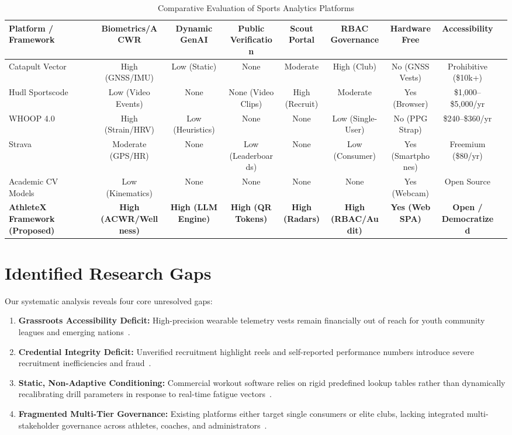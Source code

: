 \documentclass[conference]{IEEEtran}
\begin{document}
\begin{table}[htbp]
\caption{Comparative Evaluation of Sports Analytics Platforms}
\label{tab:comparison}
\centering
\begin{tabular}{@{}lcccccccc@{}}
\toprule
\textbf{Platform / Framework} & \textbf{Biometrics/ACWR} & \textbf{Dynamic GenAI} & \textbf{Public Verification} & \textbf{Scout Portal} & \textbf{RBAC Governance} & \textbf{Hardware Free} & \textbf{Accessibility} \\ \midrule
Catapult Vector~\cite{bourdon2017} & High (GNSS/IMU) & Low (Static) & None & Moderate & High (Club) & No (GNSS Vests) & Prohibitive (\$10k+) \\
Hudl Sportscode~\cite{paul2015} & Low (Video Events) & None & None (Video Clips) & High (Recruit) & Moderate & Yes (Browser) & \$1,000--\$5,000/yr \\
WHOOP 4.0~\cite{halson2014} & High (Strain/HRV) & Low (Heuristics) & None & None & Low (Single-User) & No (PPG Strap) & \$240--\$360/yr \\
Strava~\cite{buchheit2013} & Moderate (GPS/HR) & None & Low (Leaderboards) & None & Low (Consumer) & Yes (Smartphones) & Freemium (\$80/yr) \\
Academic CV Models~\cite{cao2021,lugaresi2019} & Low (Kinematics) & None & None & None & None & Yes (Webcam) & Open Source \\
\textbf{AthleteX Framework (Proposed)} & \textbf{High (ACWR/Wellness)} & \textbf{High (LLM Engine)} & \textbf{High (QR Tokens)} & \textbf{High (Radars)} & \textbf{High (RBAC/Audit)} & \textbf{Yes (Web SPA)} & \textbf{Open / Democratized} \\ \bottomrule
\end{tabular}
\end{table}

\section{Identified Research Gaps}
Our systematic analysis reveals four core unresolved gaps:
\begin{enumerate}
    \item \textbf{Grassroots Accessibility Deficit:} High-precision wearable telemetry vests remain financially out of reach for youth community leagues and emerging nations~\cite{baker2010,bourdon2017}.
    \item \textbf{Credential Integrity Deficit:} Unverified recruitment highlight reels and self-reported performance numbers introduce severe recruitment inefficiencies and fraud~\cite{phillips2021}.
    \item \textbf{Static, Non-Adaptive Conditioning:} Commercial workout software relies on rigid predefined lookup tables rather than dynamically recalibrating drill parameters in response to real-time fatigue vectors~\cite{achiam2023}.
    \item \textbf{Fragmented Multi-Tier Governance:} Existing platforms either target single consumers or elite clubs, lacking integrated multi-stakeholder governance across athletes, coaches, and administrators~\cite{sandhu1996}.
\end{enumerate}
\end{document}
